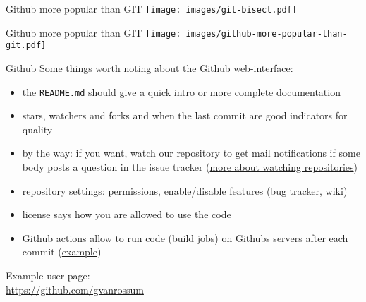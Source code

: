 \begin{frame}[fragile]{Github more popular than GIT}
    \texttt{[image: images/git-bisect.pdf]}
\end{frame}


\begin{frame}[fragile]{Github more popular than GIT}
    \texttt{[image: images/github-more-popular-than-git.pdf]}
\end{frame}


\begin{frame}[fragile]{Github}
    Some things worth noting about the
    \href{https://github.com/inwe-boku/lecture-scientific-computing/}{Github web-interface}:
    \begin{itemize}
        \item the \verb|README.md| should give a quick intro or more complete documentation
        \item stars, watchers and forks and when the last commit are good indicators for quality
        \item by the way: if you want, watch our repository to get mail notifications if some body
            posts a question in the issue tracker
            (\href{https://help.github.com/en/github/receiving-notifications-about-activity-on-github/about-notifications}{more about watching repositories})
        \item repository settings: permissions, enable/disable features (bug tracker, wiki)
        \item license says how you are allowed to use the code
        \item Github actions allow to run code (build jobs) on Githubs servers after each commit
            (\href{https://github.com/inwe-boku/lecture-scientific-computing/actions/runs/57614853}{example})
    \end{itemize}

    \pause
    \bigskip
    Example user page:\\
    \href{https://github.com/gvanrossum}{https://github.com/gvanrossum}
\end{frame}


